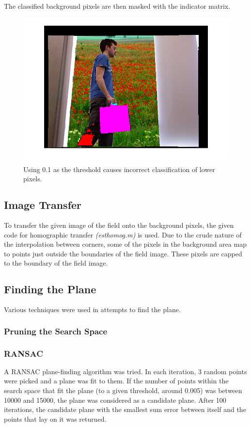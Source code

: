 \documentclass[11pt]{article}
\begin{document}
The classified background pixels are then masked with the indicator matrix.

\begin{figure}
\includegraphics[width=\textwidth]{floatingman}
\caption{Using 0.1 as the threshold causes incorrect classification of lower pixels.}
\label{failbg}
\end{figure}

\subsection{Image Transfer}

To transfer the given image of the field onto the background pixels, the given code for homographic transfer \emph{(esthomog.m)} is used. Due to the crude nature of the interpolation between corners, some of the pixels in the background area map to points just outside the boundaries of the field image. These pixels are capped to the boundary of the field image. 

\subsection{Finding the Plane}

Various techniques were used in attempts to find the plane.

\subsubsection{Pruning the Search Space}

\subsubsection{RANSAC}
A RANSAC plane-finding algorithm was tried. In each iteration, 3 random points were picked and a plane was fit to them. If the number of points within the search space that fit the plane (to a given threshold, around 0.005) was between 10000 and 15000, the plane was considered as a candidate plane. After 100 iterations, the candidate plane with the smallest sum error between itself and the points that lay on it was returned. \\
\end{document}
